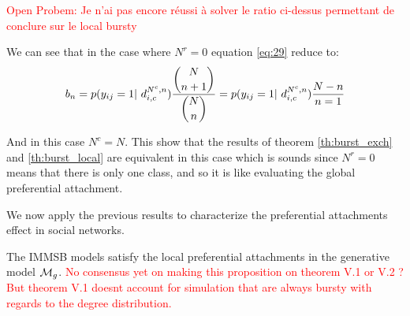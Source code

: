 \textcolor{red}{Open Probem:  Je n'ai pas encore réussi à solver le ratio ci-dessus permettant de conclure sur le local bursty}


We can see that in the case where $N^r=0$ equation \eqref{eq:29} reduce to:
\begin{equation}
b_n = p(y_{ij}=1 | d_{i,c}^{N^c,n}) \frac{\dbinom{N}{n+1}}{ \dbinom{N}{n} } =  p(y_{ij}=1 | d_{i,c}^{N^c,n}) \frac{N-n}{n=1}
\end{equation}

And in this case $N^c=N$. This show that the results of theorem \ref{th:burst_exch} and \ref{th:burst_local} are equivalent in this case which is sounds since $N^r=0$ means that there is only one class, and so it is like evaluating the global preferential attachment.

We now apply the previous results to characterize the preferential attachments effect in social networks.


\begin{proposition}
	The IMMSB models satisfy the local preferential attachments in the generative model $\mathcal{M}_g$. \textcolor{red}{No consensus yet on making this proposition on theorem V.1 or V.2 ? But theorem V.1 doesnt account for simulation that are always bursty with regards to the degree distribution.}
\end{proposition}

